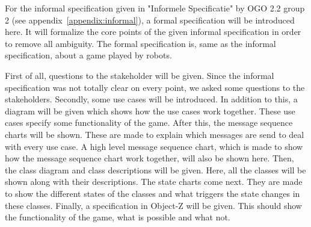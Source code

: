For the informal specification given in "Informele Specificatie" by OGO 2.2 group 2 (see appendix~\ref{appendix:informal}), a formal specification will be introduced here. It will formalize the core points of the given informal specification in order to remove all ambiguity. The formal specification is, same as the informal specification, about a game played by robots.

First of all, questions to the stakeholder will be given. Since the informal specification was not totally clear on every point, we asked some questions to the stakeholders.
Secondly, some use cases will be introduced. In addition to this, a diagram will be given which shows how the use cases work together. These use cases specify some functionality of the game.
After this, the message sequence charts will be shown. These are made to explain which messages are send to deal with every use case. A high level message sequence chart, which is made to show how the message sequence chart work together, will also be shown here.
Then, the class diagram and class descriptions will be given. Here, all the classes will be shown along with their descriptions.
The state charts come next. They are made to show the different states of the classes and what triggers the state changes in these classes. 
Finally, a specification in Object-Z will be given. This should show the functionality of the game, what is possible and what not. 


